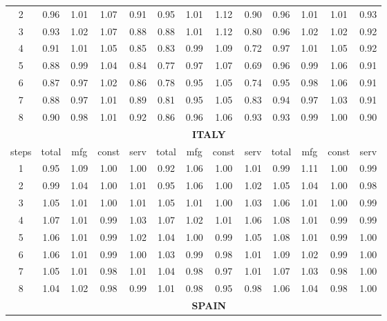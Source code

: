 \documentclass[11pt]{article}
\begin{document}
\begin{appendices}
\begin{table}[!htbp]
\begin{tabular}{c|cccc|cccc|cccc}
    2     & 0.96  & 1.01  & 1.07  & 0.91  & 0.95  & 1.01  & 1.12  & 0.90  & 0.96  & 1.01  & 1.01  & 0.93 \\
    3     & 0.93  & 1.02  & 1.07  & 0.88  & 0.88  & 1.01  & 1.12  & 0.80  & 0.96  & 1.02  & 1.02  & 0.92 \\
    4     & 0.91  & 1.01  & 1.05  & 0.85  & 0.83  & 0.99  & 1.09  & 0.72  & 0.97  & 1.01  & 1.05  & 0.92 \\
    5     & 0.88  & 0.99  & 1.04  & 0.84  & 0.77  & 0.97  & 1.07  & 0.69  & 0.96  & 0.99  & 1.06  & 0.91 \\
    6     & 0.87  & 0.97  & 1.02  & 0.86  & 0.78  & 0.95  & 1.05  & 0.74  & 0.95  & 0.98  & 1.06  & 0.91 \\
    7     & 0.88  & 0.97  & 1.01  & 0.89  & 0.81  & 0.95  & 1.05  & 0.83  & 0.94  & 0.97  & 1.03  & 0.91 \\
    8     & 0.90  & 0.98  & 1.01  & 0.92  & 0.86  & 0.96  & 1.06  & 0.93  & 0.93  & 0.99  & 1.00  & 0.90 \\
    \midrule
    \multicolumn{1}{c}{} & \multicolumn{12}{c}{\textbf{\footnotesize{ITALY}}} \\
    \midrule
    steps & total & mfg   & const & serv  & total & mfg   & const & serv  & total & mfg   & const & serv \\
    \midrule
    1     & 0.95  & 1.09  & 1.00  & 1.00  & 0.92  & 1.06  & 1.00  & 1.01  & 0.99  & 1.11  & 1.00  & 0.99 \\
    2     & 0.99  & 1.04  & 1.00  & 1.01  & 0.95  & 1.06  & 1.00  & 1.02  & 1.05  & 1.04  & 1.00  & 0.98 \\
    3     & 1.05  & 1.01  & 1.00  & 1.01  & 1.05  & 1.01  & 1.00  & 1.03  & 1.06  & 1.01  & 1.00  & 0.99 \\
    4     & 1.07  & 1.01  & 0.99  & 1.03  & 1.07  & 1.02  & 1.01  & 1.06  & 1.08  & 1.01  & 0.99  & 0.99 \\
    5     & 1.06  & 1.01  & 0.99  & 1.02  & 1.04  & 1.00  & 0.99  & 1.05  & 1.08  & 1.01  & 0.99  & 1.00 \\
    6     & 1.06  & 1.01  & 0.99  & 1.00  & 1.03  & 0.99  & 0.98  & 1.01  & 1.09  & 1.02  & 0.99  & 1.00 \\
    7     & 1.05  & 1.01  & 0.98  & 1.01  & 1.04  & 0.98  & 0.97  & 1.01  & 1.07  & 1.03  & 0.98  & 1.00 \\
    8     & 1.04  & 1.02  & 0.98  & 0.99  & 1.01  & 0.98  & 0.95  & 0.98  & 1.06  & 1.04  & 0.98  & 1.00 \\
    \midrule
    \multicolumn{1}{c}{} & \multicolumn{12}{c}{\textbf{\footnotesize{SPAIN}}} \\

\end{tabular}
\end{table}
\end{appendices}
\end{document}
